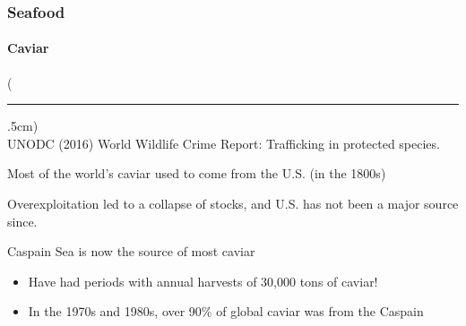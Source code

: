 \documentclass[10pt]{beamer}
\newenvironment{reference}[2]{%
	\begin{textblock*}{\textwidth}(#1,#2)
		\tiny\bgroup\color{gray}}{\egroup\end{textblock*}}
\begin{document}
\begin{frame}[t]
\frametitle{Seafood}
\framesubtitle{Caviar}
\vspace{0.5cm}

	\begin{reference}{4mm}{92mm}
		\rule{1.5cm}{0.25pt}\\
		UNODC (2016) World Wildlife Crime Report: Trafficking in protected species.
	\end{reference}
	
	Most of the world's caviar used to come from the U.S. (in the 1800s)\\
	
	\vspace{0.5cm}
	
	Overexploitation led to a collapse of stocks, and U.S. has not been a major source since.\\
	
	\vspace{0.5cm}
	
	Caspain Sea is now the source of most caviar\\
		\medskip
		\begin{itemize}
			\item Have had periods with annual harvests of 30,000 tons of caviar!
			\medskip
			\item In the 1970s and 1980s, over 90\% of global caviar was from the Caspain
		\end{itemize}
\end{frame}
\end{document}
